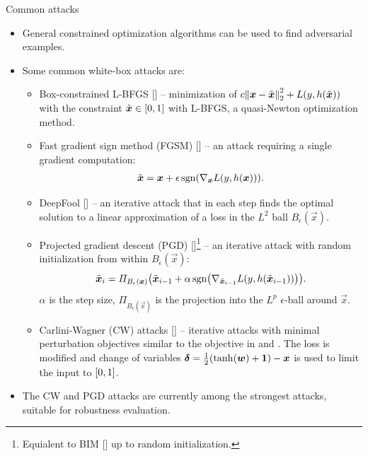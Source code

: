 \documentclass{beamer}
\newcommand{\citet}[1]{{\color{citecolor}\relscale{0.8}\textcite{#1}}}
\newcommand{\citep}[1]{{\color{citecolor}\relscale{0.8}[\textcite{#1}]}}
\begin{document}
\begin{frame}[allowframebreaks=0.9]{Common attacks}
	\begin{itemize}
		\item General constrained optimization algorithms can be used to find adversarial examples.
		\item Some common white-box attacks are:
		\begin{itemize}
			\item Box-constrained L-BFGS \citep{Szegedy:2013:IPNN} -- minimization of $c\enVert{\vec x -\tilde{\vec x}}_2^2+L(y,h(\tilde{\vec x}))$ with the constraint $\tilde{\vec x}\in\intcc{0,1}$ with L-BFGS, a quasi-Newton optimization method.
			\item Fast gradient sign method (FGSM) \citep{Goodfellow:2014:EHAE} -- an attack requiring a single gradient computation:
			\begin{align}
			\tilde{\vec x} = \vec x + \epsilon\sgn\del{\nabla_{\vec x} L(y,h(\vec x))} \text{.}
			\end{align} 
			\item DeepFool \citep{Moosavi-Dezfooli:2016:DFSAMFDNN} -- an iterative attack that in each step finds the optimal solution to a linear approximation of a loss in the $L^2$ ball $B_\epsilon(\vec x)$.
			\item Projected gradient descent (PGD) \citep{Madry:2017:TDLMRAA}\footnote[frame]{Equialent to BIM \citep{Kurakin:2016:AMLS} up to random initialization.} -- an iterative attack with random initialization from within $B_\epsilon(\vec x)$:
			\begin{equation} \label{eq:pgd}
			\tilde{\vec x}_i = \Pi_{B_\epsilon(\vec x)} \del{\tilde{\vec x}_{i-1} + \alpha\sgn\del{\nabla_{\tilde{\vec x}_{i-1}} L(y,h(\tilde{\vec x}_{i-1}))}} \text{.}
			\end{equation}
			$\alpha$ is the step size, $\Pi_{B_\epsilon(\vec x)}$ is the projection into the $L^p$ $\epsilon$-ball around $\vec x$.
			\item Carlini-Wagner (CW) attacks \citep{Carlini:2017:TERNN} --  iterative attacks with  minimal perturbation objectives similar to the objective in \citet{Szegedy:2013:IPNN}
			and \citet{Moosavi-Dezfooli:2016:DFSAMFDNN}. The loss is modified and change of variables $\vec\delta=\frac{1}{2}\del{\tanh\del{\vec w} + \cvec 1} - \vec x$ is used to limit the input to $\intcc{0,1}$. 
		\end{itemize}
		\item The CW and PGD attacks are currently among the strongest attacks, suitable for robustness evaluation.		
	\end{itemize}
\end{frame}
\end{document}
